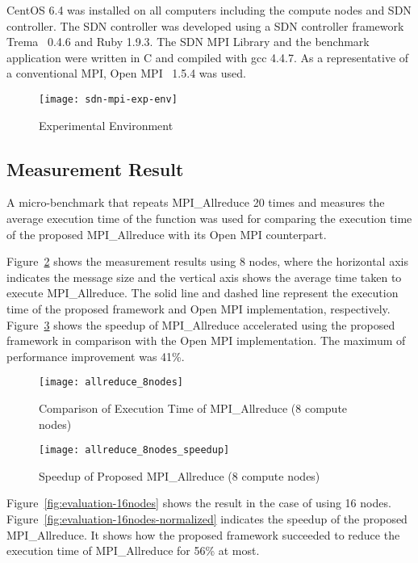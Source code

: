 CentOS 6.4 was installed on all computers including the compute nodes and
SDN controller. The SDN controller was developed using a SDN controller
framework Trema~\autocite{trema} 0.4.6 and Ruby 1.9.3. The SDN
MPI Library and the benchmark application were written in C and
compiled with gcc 4.4.7. As a representative of a conventional MPI,
Open MPI~\autocite{Gabriel2004} 1.5.4 was used.

\begin{figure}
    \centering
    \texttt{[image: sdn-mpi-exp-env]}
    \caption{Experimental Environment}%
    \label{fig:experiment-environment}
\end{figure}

\subsection{Measurement Result}

A micro-benchmark that repeats MPI\_Allreduce 20
times and measures the average execution time of the function was used
for comparing the execution time of the proposed MPI\_Allreduce
with its Open MPI counterpart.

Figure~\ref{fig:evaluation-8nodes} shows the measurement results using 8
nodes, where the horizontal axis indicates the message size and the
vertical axis shows the average time taken to execute
MPI\_Allreduce. The solid line and dashed line represent the
execution time of the proposed framework and Open MPI implementation,
respectively. Figure~\ref{fig:evaluation-8nodes-normalized} shows the speedup
of MPI\_Allreduce accelerated using the proposed framework in comparison with
the Open MPI implementation. The maximum of performance improvement was 41\%.

\begin{figure}
    \centering
    \texttt{[image: allreduce\_8nodes]}
    \caption{Comparison of Execution Time of MPI\_Allreduce (8 compute nodes)}%
    \label{fig:evaluation-8nodes}
\end{figure}

\begin{figure}
    \centering
    \texttt{[image: allreduce\_8nodes\_speedup]}
    \caption{Speedup of Proposed MPI\_Allreduce (8 compute nodes)}%
    \label{fig:evaluation-8nodes-normalized}
\end{figure}

Figure~\ref{fig:evaluation-16nodes} shows the result in the case of using 16
nodes. Figure~\ref{fig:evaluation-16nodes-normalized} indicates the speedup of
the proposed MPI\_Allreduce. It shows how the proposed framework succeeded
to reduce the execution time of MPI\_Allreduce for 56\% at most.

